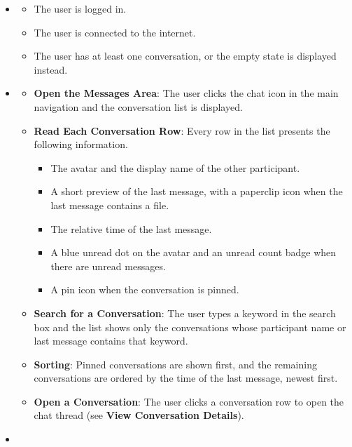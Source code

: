 \begin{itemize}[leftmargin=1.6em,topsep=4pt,itemsep=3pt,parsep=0pt,label=$\bullet$]
    \item {}

        \begin{itemize}[leftmargin=2.2em,topsep=2pt,itemsep=3pt,parsep=0pt,label=$\circ$]
            \item The user is logged in.
            \item The user is connected to the internet.
            \item The user has at least one conversation, or the empty state is displayed instead.
        \end{itemize}
    \item {}

        \begin{itemize}[leftmargin=2.2em,topsep=2pt,itemsep=3pt,parsep=0pt,label=$\circ$]
            \item \textbf{Open the Messages Area}: The user clicks the chat icon in the main navigation and the conversation list is displayed.
            \item \textbf{Read Each Conversation Row}: Every row in the list presents the following information.
                \begin{itemize}[leftmargin=2.2em,topsep=2pt,itemsep=3pt,parsep=0pt,label=$\blacksquare$]
                    \item The avatar and the display name of the other participant.
                    \item A short preview of the last message, with a paperclip icon when the last message contains a file.
                    \item The relative time of the last message.
                    \item A blue unread dot on the avatar and an unread count badge when there are unread messages.
                    \item A pin icon when the conversation is pinned.
                \end{itemize}
            \item \textbf{Search for a Conversation}: The user types a keyword in the search box and the list shows only the conversations whose participant name or last message contains that keyword.
            \item \textbf{Sorting}: Pinned conversations are shown first, and the remaining conversations are ordered by the time of the last message, newest first.
            \item \textbf{Open a Conversation}: The user clicks a conversation row to open the chat thread (see \textbf{View Conversation Details}).
        \end{itemize}
    \item {}


\end{itemize}

